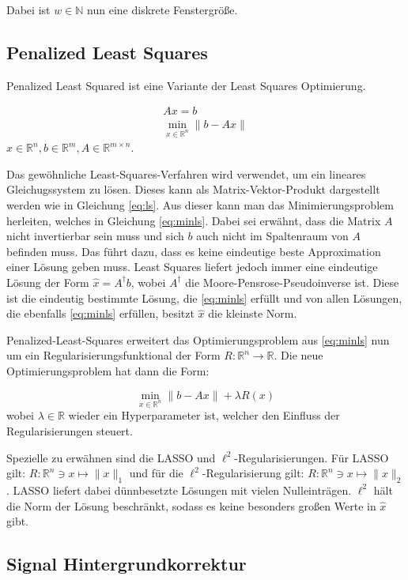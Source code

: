 \documentclass{article}
\newcommand{\R}[0]{\mathbb{R}}
\begin{document}
Dabei ist $w \in \mathbb{N}$ nun eine diskrete Fenstergröße.

\subsection{Penalized Least Squares}
Penalized Least Squared ist eine Variante der Least Squares Optimierung.

\begin{align}
    Ax = b \label{eq:ls} \\ 
    \min\limits_{x \in \R^n} \lVert b - Ax \rVert \label{eq:minls}
\end{align}
$x \in \R^n, b \in \R^m, A \in \R^{m\times n}$.

Das gewöhnliche Least-Squares-Verfahren wird verwendet, um ein lineares Gleichugssystem zu lösen. 
Dieses kann als Matrix-Vektor-Produkt dargestellt werden wie in Gleichung \ref{eq:ls}. 
Aus dieser kann man das Minimierungsproblem herleiten, welches in Gleichung \ref{eq:minls}.
Dabei sei erwähnt, dass die Matrix $A$ nicht invertierbar sein muss und sich $b$ auch nicht im Spaltenraum von $A$ befinden muss.
Das führt dazu, dass es keine eindeutige beste Approximation einer Lösung geben muss.
Least Squares liefert jedoch immer eine eindeutige Lösung der Form $\hat{x} = A^{\dagger} b$, wobei $A^{\dagger}$ die Moore-Pensrose-Pseudoinverse ist.
Diese ist die eindeutig bestimmte Lösung, die \ref{eq:minls} erfüllt und von allen Lösungen, die ebenfalls \ref{eq:minls} erfüllen, besitzt $\hat{x}$ die kleinste Norm.

Penalized-Least-Squares erweitert das Optimierungsproblem aus \ref{eq:minls} nun um ein Regularisierungsfunktional der Form $R: \R^n \to \R$.
Die neue Optimierungsproblem hat dann die Form:

\begin{equation}
    \min\limits_{x \in \R^n} \lVert b - Ax \rVert + \lambda R(x)
\end{equation}
wobei $\lambda \in \R$ wieder ein Hyperparameter ist, welcher den Einfluss der Regularisierungen steuert.

Spezielle zu erwähnen sind die LASSO und $\ell^2$-Regularisierungen. Für LASSO gilt: $R: \R^n \ni x \mapsto \lVert x \rVert_1$ und für die $\ell^2$-Regularisierung gilt: $R: \R^n \ni x \mapsto \lVert x \rVert_2$.
LASSO liefert dabei dünnbesetzte Lösungen mit vielen Nulleinträgen. 
$\ell^2$ hält die Norm der Lösung beschränkt, sodass es keine besonders großen Werte in $\hat{x}$ gibt.

\subsection{Signal Hintergrundkorrektur}
\end{document}
